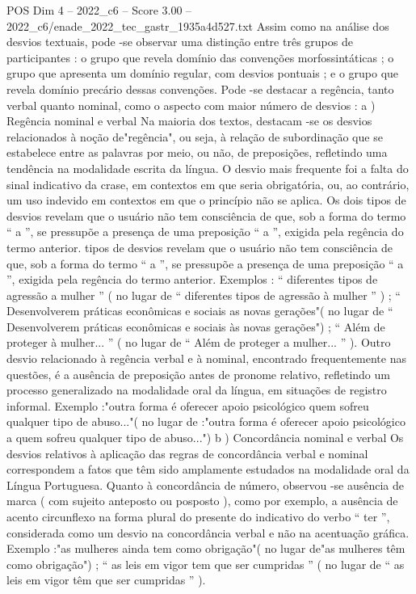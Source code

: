 \begin{textsample}{POS Dim 4 – 2022\_c6 – Score 3.00 – 2022\_c6/enade\_2022\_tec\_gastr\_1935a4d527.txt}
Assim como na análise dos desvios textuais, pode -se observar uma distinção entre três grupos de participantes : o grupo que revela domínio das convenções morfossintáticas ; o grupo que apresenta um domínio regular, com desvios pontuais ; e o grupo que revela domínio precário dessas convenções.
Pode -se destacar a regência, tanto verbal quanto nominal, como o aspecto com maior número de desvios : a ) Regência nominal e verbal Na maioria dos textos, destacam -se os desvios relacionados à noção de"regência", ou seja, à relação de subordinação que se estabelece entre as palavras por meio, ou não, de preposições, refletindo uma tendência na modalidade escrita da língua.
O desvio mais frequente foi a falta do sinal indicativo da crase, em contextos em que seria obrigatória, ou, ao contrário, um uso indevido em contextos em que o princípio não se aplica.
Os dois tipos de desvios revelam que o usuário não tem consciência de que, sob a forma do termo “ a ”, se pressupõe a presença de uma preposição “ a ”, exigida pela regência do termo anterior. tipos de desvios revelam que o usuário não tem consciência de que, sob a forma do termo “ a ”, se pressupõe a presença de uma preposição “ a ”, exigida pela regência do termo anterior.
Exemplos : “ diferentes tipos de agressão a mulher ” ( no lugar de “ diferentes tipos de agressão à mulher ” ) ; “ Desenvolverem práticas econômicas e sociais as novas gerações"( no lugar de “ Desenvolverem práticas econômicas e sociais às novas gerações") ; “ Além de proteger à mulher... ” ( no lugar de “ Além de proteger a mulher... ” ).
Outro desvio relacionado à regência verbal e à nominal, encontrado frequentemente nas questões, é a ausência de preposição antes de pronome relativo, refletindo um processo generalizado na modalidade oral da língua, em situações de registro informal.
Exemplo :"outra forma é oferecer apoio psicológico quem sofreu qualquer tipo de abuso..."( no lugar de :"outra forma é oferecer apoio psicológico a quem sofreu qualquer tipo de abuso...") b ) Concordância nominal e verbal Os desvios relativos à aplicação das regras de concordância verbal e nominal correspondem a fatos que têm sido amplamente estudados na modalidade oral da Língua Portuguesa.
Quanto à concordância de número, observou -se ausência de marca ( com sujeito anteposto ou posposto ), como por exemplo, a ausência de acento circunflexo na forma plural do presente do indicativo do verbo “ ter ”, considerada como um desvio na concordância verbal e não na acentuação gráfica.
Exemplo :"as mulheres ainda tem como obrigação"( no lugar de"as mulheres têm como obrigação") ; “ as leis em vigor tem que ser cumpridas ” ( no lugar de “ as leis em vigor têm que ser cumpridas ” ).

\end{textsample}
